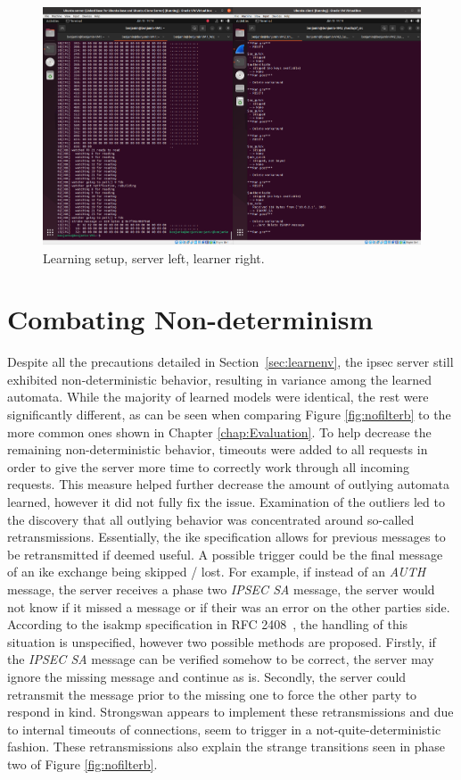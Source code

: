 \begin{figure}
	\centering
	\includegraphics[width=\linewidth]{images/VM_setup}
	\caption{Learning setup, server left, learner right.}
	\label{fig:vmsetup}
\end{figure}

\section{Combating Non-determinism} \label{subsec:nondet}
Despite all the precautions detailed in Section~\ref{sec:learnenv}, the \ac{ipsec} server still exhibited non-deterministic behavior, resulting in variance among the learned automata. While the majority of learned models were identical, the rest were significantly different, as can be seen when comparing Figure \ref{fig:nofilterb} to the more common ones shown in Chapter \ref{chap:Evaluation}. To help decrease the remaining non-deterministic behavior, timeouts were added to all requests in order to give the server more time to correctly work through all incoming requests. This measure helped further decrease the amount of outlying automata learned, however it did not fully fix the issue. Examination of the outliers led to the discovery that all outlying behavior was concentrated around so-called retransmissions. Essentially, the \ac{ike} specification allows for previous messages to be retransmitted if deemed useful. A possible trigger could be the final message of an \ac{ike} exchange being skipped / lost. For example, if instead of an \emph{AUTH} message, the server receives a phase two \emph{IPSEC SA} message, the server would not know if it missed a message or if their was an error on the other parties side. According to the \ac{isakmp} specification in RFC 2408~\cite{rfc:isakmp}, the handling of this situation is unspecified, however two possible methods are proposed. Firstly, if the \emph{IPSEC SA} message can be verified somehow to be correct, the server may ignore the missing message and continue as is. Secondly, the server could retransmit the message prior to the missing one to force the other party to respond in kind. Strongswan appears to implement these retransmissions and due to internal timeouts of connections, seem to trigger in a not-quite-deterministic fashion. These retransmissions also explain the strange transitions seen in phase two of Figure \ref{fig:nofilterb}. 

